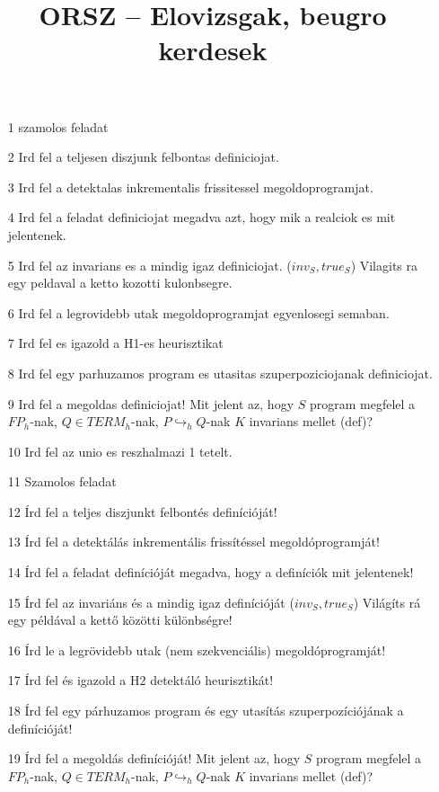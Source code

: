\documentclass{article}
\date{}
\title{ORSZ -- Elovizsgak, beugro kerdesek}
\author{}
\begin{document}
\maketitle

\begin{enumerate}
\item[1] szamolos feladat
\item[2] Ird fel a teljesen diszjunk felbontas definiciojat.
\item[3] Ird fel a detektalas inkrementalis frissitessel megoldoprogramjat.
\item[4] Ird fel a feladat definiciojat megadva azt, hogy mik a realciok es mit jelentenek.
\item[5] Ird fel az invarians es a mindig igaz definiciojat. ($inv_S, true_S$) Vilagits ra egy peldaval a ketto kozotti kulonbsegre.
\item[6] Ird fel a legrovidebb utak megoldoprogramjat egyenlosegi semaban.
\item[7] Ird fel es igazold a H1-es heurisztikat
\item[8] Ird fel egy parhuzamos program es utasitas szuperpoziciojanak definiciojat.
\item[9] Ird fel a megoldas definiciojat! Mit jelent az, hogy $S$ program megfelel a $FP_h$-nak, $Q \in TERM_h$-nak, $P \hookrightarrow_h Q$-nak $K$ invarians mellet (def)?
\item[10] Ird fel az unio es reszhalmazi 1 tetelt.
\item[11] Szamolos feladat
\item[12] Írd fel a teljes diszjunkt felbontés definícióját!
\item[13] Írd fel a detektálás inkrementális frissítéssel megoldóprogramját!
\item[14] Írd fel a feladat definícióját megadva, hogy a definíciók mit jelentenek!
\item[15] Írd fel az invariáns és a mindig igaz definícióját ($inv_S, true_S$) Világíts rá egy példával a kettő közötti különbségre!
\item[16] Írd le a legrövidebb utak (nem szekvenciális) megoldóprogramját!
\item[17] Írd fel és igazold a H2 detektáló heurisztikát!
\item[18] Írd fel egy párhuzamos program és egy utasítás szuperpozíciójának a definícióját!
\item[19] Írd fel a megoldás definícióját! Mit jelent az, hogy $S$ program megfelel a $FP_h$-nak, $Q \in TERM_h$-nak, $P \hookrightarrow_h Q$-nak $K$ invarians mellet (def)?

\end{enumerate}
\end{document}
